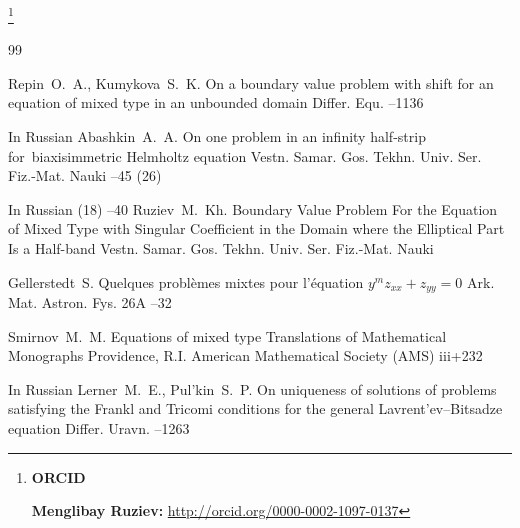\RuDate	

\newpage

\makeentitle

\thanks{{\bf ORCID}

{\bf Menglibay Ruziev:} \url{http://orcid.org/0000-0002-1097-0137}
}



\EngRef




\begin{thebibliography}{99}


\by Repin~O.~A., Kumykova~S.~K.
\paper On a boundary value problem with shift for an equation of mixed type in an unbounded domain
\jour Differ. Equ.
--1136 

\lang In Russian
\by Abashkin~A.~A.
\paper On one problem in an infinity half-strip for~biaxisimmetric Helmholtz equation
\jour Vestn. Samar. Gos. Tekhn. Univ. Ser. Fiz.-Mat. Nauki
--45
(26) 



\lang In Russian
(18) 
--40
\by Ruziev~M.~Kh.
\paper Boundary Value Problem For the Equation of Mixed Type with Singular Coefficient in the Domain where the Elliptical Part Is a Half-band
\jour Vestn. Samar. Gos. Tekhn. Univ. Ser. Fiz.-Mat. Nauki



\by Gellerstedt~S. 
\paper Quelques probl\`emes mixtes pour l'\'equation ${y^m}{z_{xx}} + {z_{yy}} = 0$ 
\jour Ark. Mat. Astron. Fys.
\vol 26A
--32



\by Smirnov~M.~M.
\book Equations of mixed type
\serial Translations of Mathematical Monographs
\publaddr Providence, R.I.
\publ  American Mathematical Society (AMS)
\totalpages iii+232 


\lang In Russian
\by Lerner~M.~E., Pul'kin~S.~P. 
\paper  On uniqueness of solutions of problems satisfying the Frankl and Tricomi conditions for the general Lavrent'ev--Bitsadze equation 
\jour Differ. Uravn. 
--1263




\end{thebibliography}
